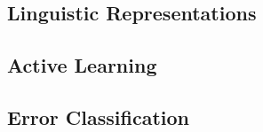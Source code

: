 \subsection{Linguistic Representations}
\label{ssec:related_transformers}
  

\subsection{Active Learning}
\label{ssec:active-learning}
  

%

\subsection{Error Classification}
\label{ssec:related_errors}




